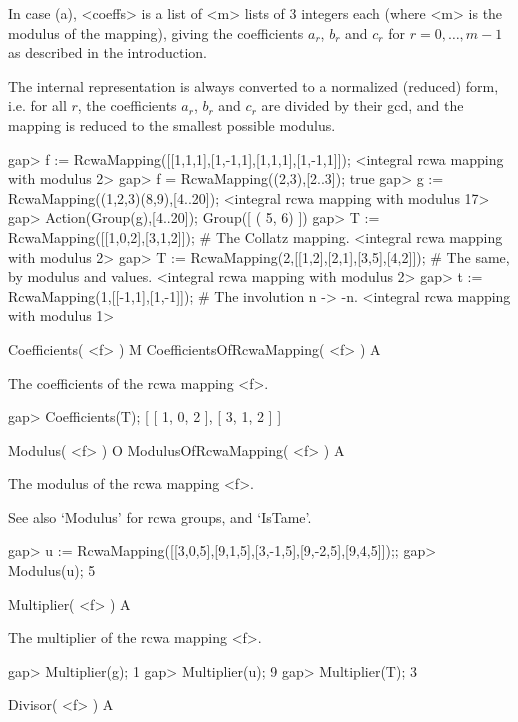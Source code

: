 In case (a), <coeffs> is a list of <m> lists of 3 integers each
(where <m> is the modulus of the mapping), giving the coefficients $a_r$,
$b_r$ and $c_r$ for $r = 0, \dots, m - 1$ as described in the
introduction.

The internal representation is always converted to a normalized (reduced)
form, i.e. for all $r$, the coefficients $a_r$, $b_r$ and $c_r$ are
divided by their gcd, and the mapping is reduced to the smallest possible
modulus.

\beginexample
gap> f := RcwaMapping([[1,1,1],[1,-1,1],[1,1,1],[1,-1,1]]);
<integral rcwa mapping with modulus 2>
gap> f = RcwaMapping((2,3),[2..3]);
true
gap> g := RcwaMapping((1,2,3)(8,9),[4..20]);
<integral rcwa mapping with modulus 17>
gap> Action(Group(g),[4..20]);
Group([ ( 5, 6) ])
gap> T := RcwaMapping([[1,0,2],[3,1,2]]); # The Collatz mapping.
<integral rcwa mapping with modulus 2>
gap> T := RcwaMapping(2,[[1,2],[2,1],[3,5],[4,2]]); # The same, by modulus and values.
<integral rcwa mapping with modulus 2>
gap> t := RcwaMapping(1,[[-1,1],[1,-1]]); # The involution n -> -n.
<integral rcwa mapping with modulus 1>
\endexample


\>Coefficients( <f> ) M
\>CoefficientsOfRcwaMapping( <f> ) A

The coefficients of the rcwa mapping <f>.

\beginexample
gap> Coefficients(T);
[ [ 1, 0, 2 ], [ 3, 1, 2 ] ]
\endexample

\>Modulus( <f> ) O
\>ModulusOfRcwaMapping( <f> ) A

The modulus of the rcwa mapping <f>.

See also `Modulus' for rcwa groups, and `IsTame'.

\beginexample
gap> u := RcwaMapping([[3,0,5],[9,1,5],[3,-1,5],[9,-2,5],[9,4,5]]);;
gap> Modulus(u);
5
\endexample


\>Multiplier( <f> ) A

The multiplier of the rcwa mapping <f>.

\beginexample
gap> Multiplier(g);
1
gap> Multiplier(u);
9
gap> Multiplier(T);
3
\endexample

\>Divisor( <f> ) A

